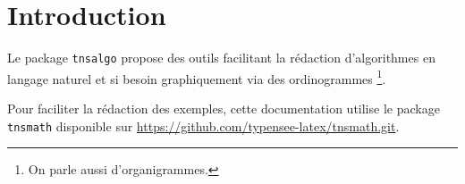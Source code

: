 \documentclass[12pt,a4paper]{article}
\begin{document}
\section{Introduction}

Le package \verb#tnsalgo# propose des outils facilitant la rédaction d'algorithmes en langage naturel et si besoin graphiquement via des ordinogrammes
\footnote{
	On parle aussi d'organigrammes.
}.


\begin{remark}
	Pour faciliter la rédaction des exemples, cette documentation utilise le package \verb#tnsmath# disponible sur \url{https://github.com/typensee-latex/tnsmath.git}.
\end{remark}
\end{document}
